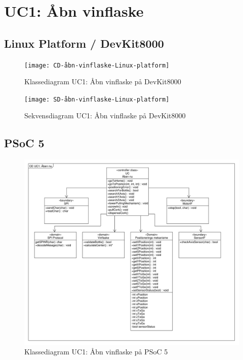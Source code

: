 \section{UC1: Åbn vinflaske}

\subsection{Linux Platform / DevKit8000}
\begin{figure}[H]
	\caption{Klassediagram UC1: Åbn vinflaske på DevKit8000}
	\label{CD:UC1-devkit}
	\texttt{[image: CD-åbn-vinflaske-Linux-platform]}
\end{figure}

\begin{figure}[H]
	\caption{Sekvensdiagram UC1: Åbn vinflaske på DevKit8000}
	\label{SD:UC1-devkit}
	\texttt{[image: SD-åbn-vinflaske-Linux-platform]}
\end{figure}

\subsection{PSoC 5}
\begin{figure}[H]
	\caption{Klassediagram UC1: Åbn vinflaske på PSoC 5}
	\label{CD:PSoC:UC1}
	\includegraphics[scale=0.35,trim=0 0 0 0, clip]{APPSoC/UC1-CD-Aaben-nu-PSoC}
\end{figure}

